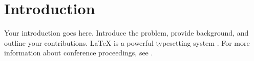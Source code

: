 \section{Introduction}
\label{sec:introduction}

Your introduction goes here. Introduce the problem, provide background, and outline your contributions. LaTeX is a powerful typesetting system \cite{example2023}. For more information about conference proceedings, see \cite{conference2022}.

